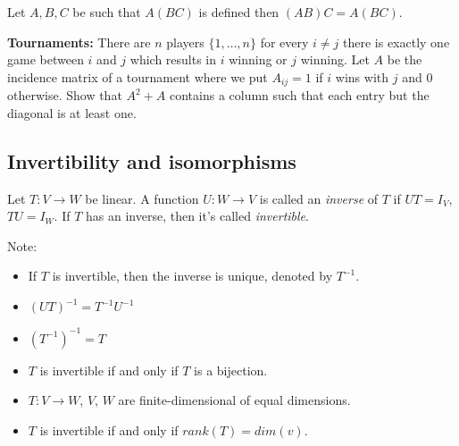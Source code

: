\documentclass[12pt]{article}
\newenvironment{theorem}[2][Theorem]{\begin{trivlist}
\item[\hskip \labelsep {\bfseries #1}\hskip \labelsep {\bfseries #2.}]}{\end{trivlist}}
\newenvironment{definition}[2][Definition]{\begin{trivlist}
\item[\hskip \labelsep {\bfseries #1}\hskip \labelsep {\bfseries #2}]}{\end{trivlist}}
\begin{document}
\begin{theorem}{2.16}
Let $A, B, C$ be such that $A(BC)$ is defined then $(AB)C = A(BC)$.
\end{theorem}

\textbf{Tournaments:} There are $n$ players $\{1, \dots, n\}$ for every $i \neq j$ there is exactly one game between $i$ and $j$ which results in $i$ winning or $j$ winning. Let $A$ be the incidence matrix of a tournament where we put $A_{ij} = 1$ if $i$ wins with $j$ and $0$ otherwise. Show that $A^2 + A$ contains a column such that each entry but the diagonal is at least one.

\begin{center}
\end{center}

\subsection{Invertibility and isomorphisms}

\begin{definition}{6}
Let $T : V \to W$ be linear. A function $U : W \to V$ is called an \textit{inverse} of $T$ if $UT = I_V$, $TU = I_W$. If $T$ has an inverse, then it's called \textit{invertible}.
\end{definition}

\noindent Note:

\begin{itemize}
    \item If $T$ is invertible, then the inverse is unique, denoted by $T^{-1}.$
    
    \item $(UT)^{-1} = T^{-1}U^{-1}$
    
    \item $(T^{-1})^{-1} = T$
    
    \item $T$ is invertible if and only if $T$ is a bijection.
    
    \item $T : V \to W$, $V$, $W$ are finite-dimensional of equal dimensions.
    
    \item $T$ is invertible if and only if $rank(T) = dim(v)$.
\end{itemize}
\end{document}
